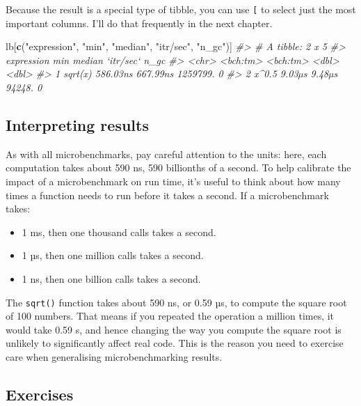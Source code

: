 \documentclass[]{book}
\newenvironment{Shaded}{\begin{snugshade}}{\end{snugshade}}
\newcommand{\CommentTok}[1]{\textcolor[rgb]{0.37,0.37,0.37}{\textit{#1}}}
\newcommand{\KeywordTok}[1]{\textcolor[rgb]{0.27,0.27,0.27}{\textbf{#1}}}
\newcommand{\NormalTok}[1]{#1}
\newcommand{\StringTok}[1]{\textcolor[rgb]{0.5,0.5,0.5}{#1}}
\providecommand{\tightlist}{%
  \setlength{\itemsep}{0pt}\setlength{\parskip}{0pt}}
\begin{document}
Because the result is a special type of tibble, you can use \texttt{{[}} to select just the most important columns. I'll do that frequently in the next chapter.

\begin{Shaded}
\begin{Highlighting}[]
\NormalTok{lb[}\KeywordTok{c}\NormalTok{(}\StringTok{"expression"}\NormalTok{, }\StringTok{"min"}\NormalTok{, }\StringTok{"median"}\NormalTok{, }\StringTok{"itr/sec"}\NormalTok{, }\StringTok{"n_gc"}\NormalTok{)]}
\CommentTok{#> # A tibble: 2 x 5}
\CommentTok{#>   expression      min   median `itr/sec`  n_gc}
\CommentTok{#>   <chr>      <bch:tm> <bch:tm>     <dbl> <dbl>}
\CommentTok{#> 1 sqrt(x)    586.03ns 667.99ns  1259799.     0}
\CommentTok{#> 2 x^0.5        9.03µs   9.48µs    94248.     0}
\end{Highlighting}
\end{Shaded}

\hypertarget{interpreting-results}{%
\subsection{Interpreting results}\label{interpreting-results}}

As with all microbenchmarks, pay careful attention to the units: here, each computation takes about 590 ns, 590 billionths of a second. To help calibrate the impact of a microbenchmark on run time, it's useful to think about how many times a function needs to run before it takes a second. If a microbenchmark takes:

\begin{itemize}
\tightlist
\item
  1 ms, then one thousand calls takes a second.
\item
  1 µs, then one million calls takes a second.
\item
  1 ns, then one billion calls takes a second.
\end{itemize}

The \texttt{sqrt()} function takes about 590 ns, or 0.59 µs, to compute the square root of 100 numbers. That means if you repeated the operation a million times, it would take 0.59 s, and hence changing the way you compute the square root is unlikely to significantly affect real code. This is the reason you need to exercise care when generalising microbenchmarking results.

\hypertarget{exercises-17}{%
\subsection{Exercises}\label{exercises-17}}
\end{document}
